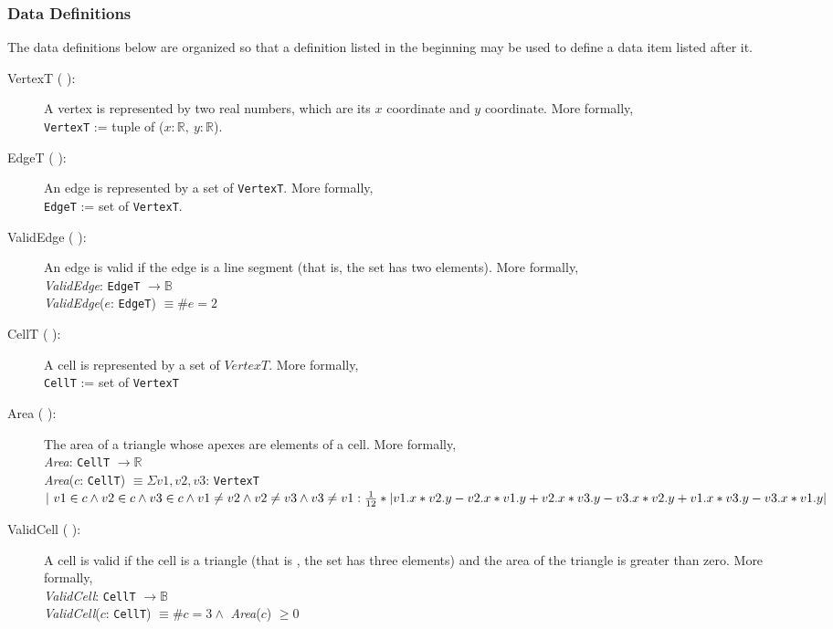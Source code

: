 \documentclass[12pt,titlepage]{article}
\begin{document}
\subsubsection{Data Definitions}
The data definitions below are organized so that a definition listed in the beginning may be used to define a data item  listed after it.
\begin{description} 
\item [VertexT ( \dtheddnum \label{dVertexT}):] A vertex is represented by two real numbers, which are its $x$ coordinate and $y$ coordinate. More formally,\\
{\tt VertexT} := tuple of ($x: \mathbb{R},\  y: \mathbb{R}$).

\item [EdgeT ( \dtheddnum \label{dEdgeT}):] An edge is represented by a set of {\tt VertexT}. More formally,\\
{\tt EdgeT} := set of {\tt VertexT}.

\item [ValidEdge ( \dtheddnum \label{dValidEdge}):] An edge is valid if the edge is a line segment (that is, the set has two elements). More formally, \\
{\it ValidEdge}: {\tt EdgeT} $\rightarrow \mathbb{B}$\\
{\it ValidEdge}($e$: {\tt EdgeT}) $\equiv \# e = 2$

\item [CellT ( \dtheddnum \label{dCellT}):] A cell is represented by a set of $VertexT$. More formally, \\
{\tt CellT} := set of {\tt VertexT}

\item [Area ( \dtheddnum \label{dArea}):] The area of a triangle whose apexes are elements of a cell. More formally, \\
{\it Area}: {\tt CellT} $\rightarrow \mathbb{R}$\\
{\it Area}($c$: {\tt CellT}) $\equiv \Sigma v1,v2,v3$: {\tt VertexT} $|\ v1\in c \wedge v2\in c \wedge v3\in c \\
\wedge v1\neq v2 \wedge v2\neq v3 \wedge v3\neq v1:\\
\frac{1}{12}* |v1.x*v2.y - v2.x*v1.y +\\
v2.x*v3.y - v3.x*v2.y +\\
v1.x*v3.y - v3.x*v1.y |$

\item [ValidCell ( \dtheddnum \label{dValidCell}):] A cell is valid if the cell is a triangle (that is , the set has three elements) and the area of the triangle is greater than zero. More formally, \\
{\it ValidCell}: {\tt CellT} $\rightarrow \mathbb{B}$\\
{\it ValidCell}($c$: {\tt CellT}) $\equiv \# c = 3 \wedge$ {\it Area}($c$) $\geq 0$


\end{description}
\end{document}
